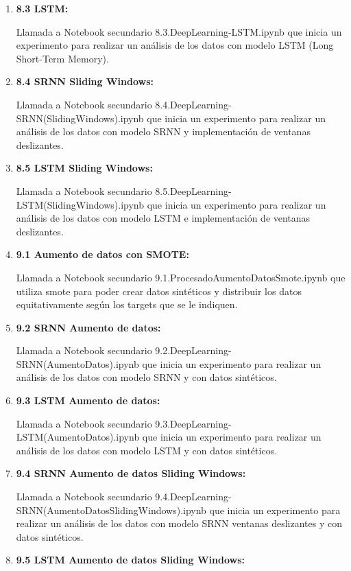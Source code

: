 \begin{enumerate}
\begin{itemize}
\begin{enumerate}
	\item 
	\textbf{8.3 LSTM:}
	
	Llamada a Notebook secundario 8.3.DeepLearning-LSTM.ipynb que inicia un experimento para realizar un análisis de los datos con modelo LSTM (Long Short-Term Memory).	
	
	\item 
	\textbf{8.4 SRNN Sliding Windows:}
	
	Llamada a Notebook secundario 8.4.DeepLearning-SRNN(SlidingWindows).ipynb que inicia un experimento para realizar un análisis de los datos con modelo SRNN y implementación de ventanas deslizantes.			
	
	\item 
	\textbf{8.5 LSTM Sliding Windows:}
	
	Llamada a Notebook secundario 8.5.DeepLearning-LSTM(SlidingWindows).ipynb que inicia un experimento para realizar un análisis de los datos con modelo LSTM e implementación de ventanas deslizantes.		
	
	\item 
	\textbf{9.1 Aumento de datos con SMOTE:}
	
	Llamada a Notebook secundario 9.1.ProcesadoAumentoDatosSmote.ipynb que utiliza smote para poder crear datos sintéticos y distribuir los datos equitativamente según los targets que se le indiquen.
	\item 
	\textbf{9.2 SRNN Aumento de datos:}
	
	Llamada a Notebook secundario 9.2.DeepLearning-SRNN(AumentoDatos).ipynb que inicia un experimento para realizar un análisis de los datos con modelo SRNN y con datos sintéticos.	
	
	\item 
	\textbf{9.3 LSTM Aumento de datos:}
	
	Llamada a Notebook secundario 9.3.DeepLearning-LSTM(AumentoDatos).ipynb que inicia un experimento para realizar un análisis de los datos con modelo LSTM y con datos sintéticos.	
	
	\item 
	\textbf{9.4 SRNN Aumento de datos Sliding Windows:}
	
	Llamada a Notebook secundario 9.4.DeepLearning-SRNN(AumentoDatosSlidingWindows).ipynb que inicia un experimento para realizar un análisis de los datos con modelo SRNN ventanas deslizantes y con datos sintéticos.			
	
	\item 
	\textbf{9.5 LSTM Aumento de datos Sliding Windows:}
	

\end{enumerate}
\end{itemize}
\end{enumerate}

